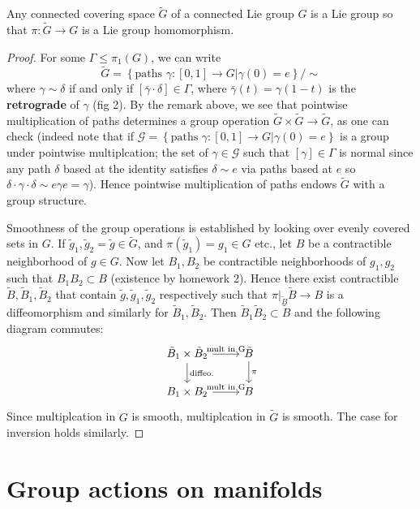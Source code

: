\documentclass{../mathnotes}
\begin{document}
\begin{thm}
    Any connected covering space $\tilde G$ of a connected Lie group $G$ is a Lie group so that $\pi:\tilde G\to G$ is a Lie group homomorphism.
\end{thm}
\begin{proof}
    For some $\Gamma\leq\pi_1(G)$, we can write
    \[\tilde G=\left\{ \text{paths } \gamma:[0,1]\to G | \gamma(0)=e \right\}/\sim\]
    where $\gamma \sim\delta$ if and only if $[\bar\gamma\cdot\delta]\in\Gamma$, where $\bar\gamma(t)=\gamma(1-t)$ is the \textbf{retrograde} of $\gamma$ (fig 2).
    By the remark above, we see that pointwise multiplication of paths determines a group operation $\tilde G\times\tilde G\to\tilde G$, as one can check
    (indeed note that if $\mathcal{G}=\left\{ \text{paths }\gamma:[0,1]\to G|\gamma(0)=e \right\}$ is a group under pointwise multiplcation; the set of
    $\gamma\in\mathcal{G}$ such that $[\gamma]\in\Gamma$ is normal since any path $\delta$ based at the identity satisfies $\delta\sim e$ via paths based at $e$
    so $\delta\cdot\gamma\cdot\delta\sim e\gamma e=\gamma$). Hence pointwise multiplication of paths endows $\tilde G$ with a group structure.

    Smoothness of the group operations is established by looking over evenly covered sets in $G$.
    If $\tilde g_1,\tilde g_2=\tilde g\in\tilde G$, and $\pi(\tilde g_1)=g_1\in G$ etc., let $B$ be a contractible neighborhood of $g\in G$.
    Now let $B_1,B_2$ be contractible neighborhoods of $g_1,g_2$ such that $B_1B_2\subset B$ (existence by homework 2). Hence there exist contractible
    $\tilde B,\tilde B_1, \tilde B_2$ that contain $\tilde g,\tilde g_1,\tilde g_2$ respectively such that $\pi|_{\tilde B}\tilde B\to B$ is a diffeomorphism and 
    similarly for $\tilde B_1,\tilde B_2$. Then $\tilde B_1\tilde B_2\subset\tilde B$ and the following diagram commutes:
    \[
    \begin{tikzcd}
        \tilde B_1\times\tilde B_2\arrow{r}{\text{mult in G}}\arrow{d}{\text{diffeo.}} & \tilde B\arrow{d}{\pi}\\
        B_1\times B_2\arrow{r}{\text{mult in G}} & B
    \end{tikzcd}
    \]
    Since multiplcation in $G$ is smooth, multiplcation in $\tilde G$ is smooth. The case for inversion holds similarly.
\end{proof}

\section{Group actions on manifolds}
\end{document}
